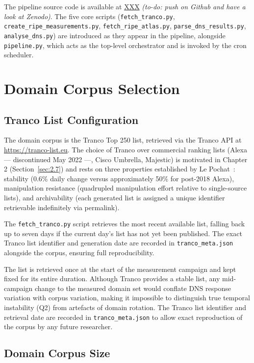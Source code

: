 The pipeline source code is available at \url{XXX} \textit{(to-do: push on Github and have a look at Zenodo)}. The five core scripts (\texttt{fetch\_tranco.py}, \texttt{create\_ripe\_measurements.py}, \texttt{fetch\_ripe\_atlas.py}, \texttt{parse\_dns\_results.py}, \texttt{analyse\_dns.py}) are introduced as they appear in the pipeline, alongside \texttt{pipeline.py}, which acts as the top-level orchestrator and is invoked by the cron scheduler.

\section{Domain Corpus Selection}
\label{sec:3.2}

\subsection{Tranco List Configuration}
\label{subsec:3.2.1}

The domain corpus is the Tranco Top 250 list, retrieved via the Tranco API at \url{https://tranco-list.eu}. The choice of Tranco over commercial ranking lists (Alexa — discontinued May 2022 —, Cisco Umbrella, Majestic) is motivated in Chapter 2 (Section~\ref{sec:2.7}) and rests on three properties established by Le Pochat~\cite{LePochat2019}: stability (0.6\% daily change versus approximately 50\% for post-2018 Alexa), manipulation resistance (quadrupled manipulation effort relative to single-source lists), and archivability (each generated list is assigned a unique identifier retrievable indefinitely via permalink).

The \texttt{fetch\_tranco.py} script retrieves the most recent available list, falling back up to seven days if the current day's list has not yet been published. The exact Tranco list identifier and generation date are recorded in \texttt{tranco\_meta.json} alongside the corpus, ensuring full reproducibility.

The list is retrieved once at the start of the measurement campaign and kept fixed for its entire duration. Although Tranco provides a stable list, any mid-campaign change to the measured domain set would conflate \ac{DNS} response variation with corpus variation, making it impossible to distinguish true temporal instability (Q2) from artefacts of domain rotation. The Tranco list identifier and retrieval date are recorded in \texttt{tranco\_meta.json} to allow exact reproduction of the corpus by any future researcher.

\subsection{Domain Corpus Size}
\label{subsec:3.2.2}

